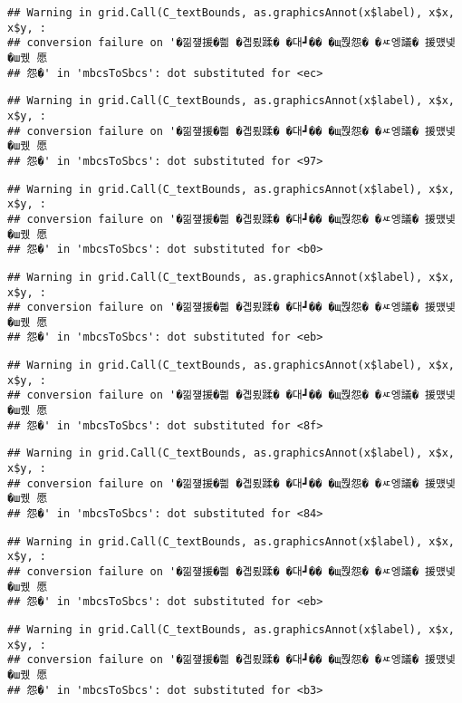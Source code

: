 \documentclass[
]{article}
\begin{document}
\begin{verbatim}
## Warning in grid.Call(C_textBounds, as.graphicsAnnot(x$label), x$x, x$y, :
## conversion failure on '�낆쟾援�쁾 �곕룄蹂� �대┛�� �щ쭩怨� �ㅼ엥議� 援먰넻�ш퀬 愿
## 怨�' in 'mbcsToSbcs': dot substituted for <ec>
\end{verbatim}

\begin{verbatim}
## Warning in grid.Call(C_textBounds, as.graphicsAnnot(x$label), x$x, x$y, :
## conversion failure on '�낆쟾援�쁾 �곕룄蹂� �대┛�� �щ쭩怨� �ㅼ엥議� 援먰넻�ш퀬 愿
## 怨�' in 'mbcsToSbcs': dot substituted for <97>
\end{verbatim}

\begin{verbatim}
## Warning in grid.Call(C_textBounds, as.graphicsAnnot(x$label), x$x, x$y, :
## conversion failure on '�낆쟾援�쁾 �곕룄蹂� �대┛�� �щ쭩怨� �ㅼ엥議� 援먰넻�ш퀬 愿
## 怨�' in 'mbcsToSbcs': dot substituted for <b0>
\end{verbatim}

\begin{verbatim}
## Warning in grid.Call(C_textBounds, as.graphicsAnnot(x$label), x$x, x$y, :
## conversion failure on '�낆쟾援�쁾 �곕룄蹂� �대┛�� �щ쭩怨� �ㅼ엥議� 援먰넻�ш퀬 愿
## 怨�' in 'mbcsToSbcs': dot substituted for <eb>
\end{verbatim}

\begin{verbatim}
## Warning in grid.Call(C_textBounds, as.graphicsAnnot(x$label), x$x, x$y, :
## conversion failure on '�낆쟾援�쁾 �곕룄蹂� �대┛�� �щ쭩怨� �ㅼ엥議� 援먰넻�ш퀬 愿
## 怨�' in 'mbcsToSbcs': dot substituted for <8f>
\end{verbatim}

\begin{verbatim}
## Warning in grid.Call(C_textBounds, as.graphicsAnnot(x$label), x$x, x$y, :
## conversion failure on '�낆쟾援�쁾 �곕룄蹂� �대┛�� �щ쭩怨� �ㅼ엥議� 援먰넻�ш퀬 愿
## 怨�' in 'mbcsToSbcs': dot substituted for <84>
\end{verbatim}

\begin{verbatim}
## Warning in grid.Call(C_textBounds, as.graphicsAnnot(x$label), x$x, x$y, :
## conversion failure on '�낆쟾援�쁾 �곕룄蹂� �대┛�� �щ쭩怨� �ㅼ엥議� 援먰넻�ш퀬 愿
## 怨�' in 'mbcsToSbcs': dot substituted for <eb>
\end{verbatim}

\begin{verbatim}
## Warning in grid.Call(C_textBounds, as.graphicsAnnot(x$label), x$x, x$y, :
## conversion failure on '�낆쟾援�쁾 �곕룄蹂� �대┛�� �щ쭩怨� �ㅼ엥議� 援먰넻�ш퀬 愿
## 怨�' in 'mbcsToSbcs': dot substituted for <b3>
\end{verbatim}
\end{document}
